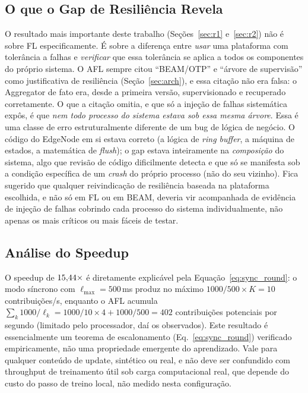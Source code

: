 \documentclass[conference,a4paper]{IEEEtran}
\begin{document}
\subsection{O que o Gap de Resiliência Revela}
\label{sec:discussion_gap}

O resultado mais importante deste trabalho (Seções~\ref{sec:r1}
e~\ref{sec:r2}) não é sobre FL especificamente. É sobre a diferença
entre \emph{usar} uma plataforma com tolerância a falhas e \emph{verificar}
que essa tolerância se aplica a todos os componentes do próprio sistema. O
AFL sempre citou ``BEAM/OTP'' e ``árvore de supervisão'' como justificativa
de resiliência (Seção~\ref{sec:arch}), e essa citação não era falsa: o
Aggregator de fato era, desde a primeira versão, supervisionado e
recuperado corretamente. O que a citação omitia, e que só a injeção de
falhas sistemática expôs, é que \emph{nem todo processo do sistema estava
sob essa mesma árvore}. Essa é uma classe de erro estruturalmente diferente
de um bug de lógica de negócio. O código do EdgeNode em si estava correto
(a lógica de \textit{ring buffer}, a máquina de estados,
a matemática de \textit{flush}); o gap estava inteiramente na
\emph{composição} do sistema, algo que revisão de código dificilmente
detecta e que só se manifesta sob a condição específica de um \textit{crash}
do próprio processo (não do seu vizinho). Fica sugerido que qualquer
reivindicação de resiliência baseada na plataforma escolhida, e não só em
FL ou em BEAM, deveria vir acompanhada de evidência de injeção de
falhas cobrindo cada processo do sistema individualmente, não apenas os
mais críticos ou mais fáceis de testar.

\subsection{Análise do Speedup}

O speedup de $15{,}44\times$ é diretamente explicável pela Equação~\eqref{eq:sync_round}:
o modo síncrono com $\ell_{\max}=500$\,ms produz no máximo
$1000/500 \times K = 10$ contribuições/s, enquanto o AFL acumula
$\sum_k 1000/\ell_k = 1000/10 \times 4 + 1000/500 = 402$ contribuições
potenciais por segundo (limitado pelo processador, daí os \statExpAAsyncUps{} observados).
Este resultado é essencialmente um teorema de escalonamento
(Eq.~\ref{eq:sync_round}) verificado empiricamente, não uma propriedade
emergente do aprendizado. Vale para qualquer conteúdo de update, sintético
ou real, e não deve ser confundido com throughput de treinamento útil sob
carga computacional real, que depende do custo do passo de treino local,
não medido nesta configuração.
\end{document}
